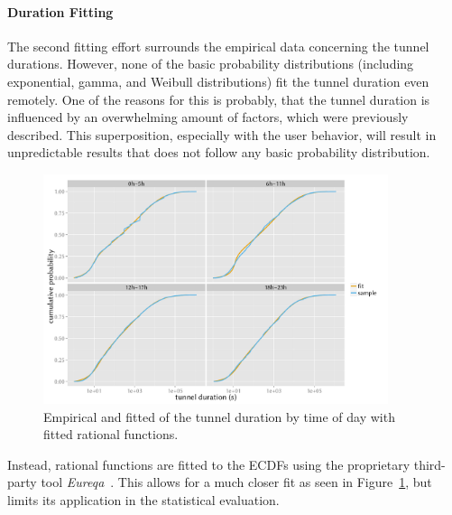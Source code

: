 \paragraph{Duration Fitting}

The second fitting effort surrounds the empirical data concerning the tunnel durations. However, none of the basic probability distributions (including exponential, gamma, and Weibull distributions) fit the tunnel duration even remotely. One of the reasons for this is probably, that the tunnel duration is influenced by an overwhelming amount of factors, which were previously described. This superposition, especially with the user behavior, will result in unpredictable results that does not follow any basic probability distribution.

\begin{figure}[htb]
	\centering
	\includegraphics[width=0.9\textwidth]{images/R-duration-fit-cdf-facets.pdf}
	\caption{Empirical and fitted  of the tunnel duration by time of day with fitted rational functions.}
\label{c4:fig:fittedsdurationlots}
\end{figure}

Instead, rational functions are fitted to the \glspl{ECDF} using the proprietary third-party tool \textit{Eureqa}~\cite{eureqa_paper, eureqa_software}. This allows for a much closer fit as seen in Figure~\ref{c4:fig:fittedsdurationlots}, but limits its application in the statistical evaluation.

